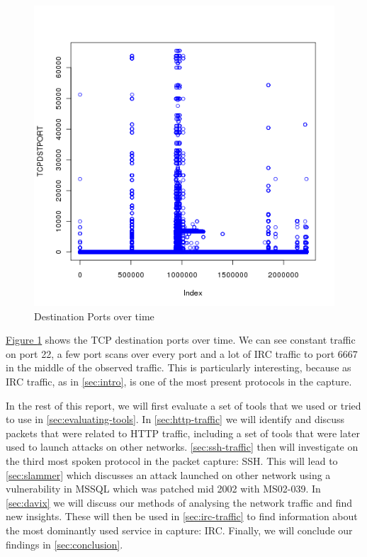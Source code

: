 \documentclass[a4paper,
    11pt,
    normalheadings,
    parindent,
    UKenglish,
    abstracton,
    ]{scrartcl}
\begin{document}
\begin{figure}
    \begin{center}\includegraphics[width=\textwidth]{bin/lab07-tcpdstport_syn1_ack0.png}\end{center}
    \caption{Destination Ports over time}
    \label{pic:dest-ports-over-time} %
\end{figure}
\hyperref[pic:dest-ports-over-time]{Figure \ref*{pic:dest-ports-over-time}}
shows the TCP destination ports over time.
We can see constant traffic on port 22, a few port scans over every port and a lot of IRC traffic to port 6667 in the middle of the observed traffic.
This is particularly interesting, because as IRC traffic, as in \autoref{sec:intro}, is one of the most present protocols in the capture.





In the rest of this report, we will first evaluate a set of tools that we used or tried to use in \autoref{sec:evaluating-tools}.
In \autoref{sec:http-traffic} we will identify and discuss packets that were related to HTTP traffic, including a set of tools that were later used to launch attacks on other networks.
\autoref{sec:ssh-traffic} then will investigate on the third most spoken protocol in the packet capture: SSH.
This will lead to \autoref{sec:slammer} which discusses an attack launched on other network using a vulnerability in MSSQL which was patched mid 2002 with MS02-039.
In \autoref{sec:davix} we will discuss our methods of analysing the network traffic and find new insights.
These will then be used in \autoref{sec:irc-traffic} to find information about the most dominantly used service in capture: IRC.
Finally, we will conclude our findings in \autoref{sec:conclusion}.
\end{document}
